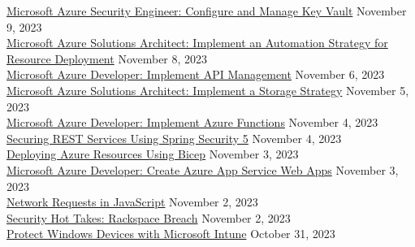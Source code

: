 \documentclass[10pt]{res} %
\begin{document}
\begin{resume}
\href{https://bjdelacruz.dev/files/certificates/pluralsight/Microsoft_Azure_Security_Engineer_Configure_and_Manage_Key_Vault.pdf}{\color{blue}Microsoft Azure Security Engineer: Configure and Manage Key Vault} \hfill November 9, 2023 \\
\href{https://bjdelacruz.dev/files/certificates/pluralsight/Microsoft_Azure_Solutions_Architect_-_Implement_an_Automation_Strategy_for_Resource_Deployment.pdf}{\color{blue}Microsoft Azure Solutions Architect: Implement an Automation Strategy for Resource Deployment} \hfill November 8, 2023 \\
\href{https://bjdelacruz.dev/files/certificates/pluralsight/15_Microsoft_Azure_Developer_Implement_API_Management.pdf}{\color{blue}Microsoft Azure Developer: Implement API Management} \hfill November 6, 2023 \\
\href{https://bjdelacruz.dev/files/certificates/pluralsight/3_Microsoft_Azure_Solutions_Architect_Implement_a_Storage_Strategy.pdf}{\color{blue}Microsoft Azure Solutions Architect: Implement a Storage Strategy} \hfill November 5, 2023 \\
\href{https://bjdelacruz.dev/files/certificates/pluralsight/4_Microsoft_Azure_Developer_Implement_Azure_Functions.pdf}{\color{blue}Microsoft Azure Developer: Implement Azure Functions} \hfill November 4, 2023 \\
\href{https://bjdelacruz.dev/files/certificates/pluralsight/Securing_REST_Services_Using_Spring_Security_5.pdf}{\color{blue}Securing REST Services Using Spring Security 5} \hfill November 4, 2023 \\
\href{https://bjdelacruz.dev/files/certificates/pluralsight/Deploying_Azure_Resources_Using_Bicep.pdf}{\color{blue}Deploying Azure Resources Using Bicep} \hfill November 3, 2023 \\
\href{https://bjdelacruz.dev/files/certificates/pluralsight/3_Microsoft_Azure_Developer_Create_Azure_App_Service_Web_Apps.pdf}{\color{blue}Microsoft Azure Developer: Create Azure App Service Web Apps} \hfill November 3, 2023 \\
\href{https://bjdelacruz.dev/files/certificates/pluralsight/Network_Requests_in_JavaScript.pdf}{\color{blue}Network Requests in JavaScript} \hfill November 2, 2023 \\
\href{https://bjdelacruz.dev/files/certificates/pluralsight/Security_Hot_Takes_Rackspace_Breach.pdf}{\color{blue}Security Hot Takes: Rackspace Breach} \hfill November 2, 2023 \\
\href{https://bjdelacruz.dev/files/certificates/pluralsight/Protect_Windows_Devices_with_Microsoft_Intune.pdf}{\color{blue}Protect Windows Devices with Microsoft Intune} \hfill October 31, 2023 \\

\end{resume}
\end{document}

